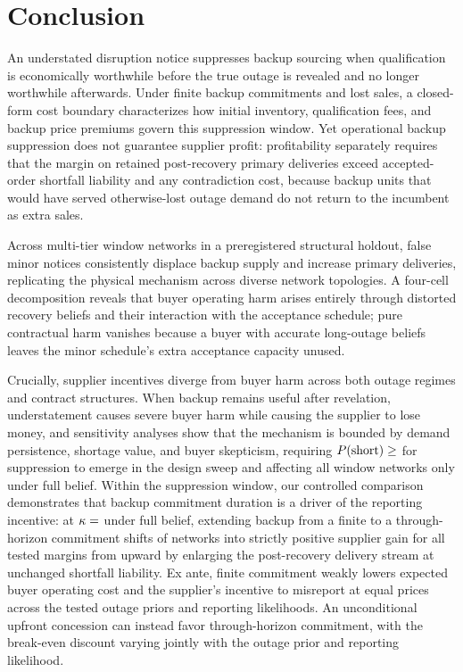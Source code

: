 \documentclass[preprint,11pt,authoryear]{elsarticle}
\newcommand{\claim}[1]{} %
\begin{document}
\section{Conclusion}\label{sec:conclusion}
\claim{C1}An understated disruption notice suppresses backup sourcing when qualification is economically worthwhile before the true outage is revealed and no longer worthwhile afterwards. Under finite backup commitments and lost sales, a closed-form cost boundary characterizes how initial inventory, qualification fees, and backup price premiums govern this suppression window. \claim{C2}Yet operational backup suppression does not guarantee supplier profit: profitability separately requires that the margin on retained post-recovery primary deliveries exceed accepted-order shortfall liability and any contradiction cost, because backup units that would have served otherwise-lost outage demand do not return to the incumbent as extra sales.

\claim{C3}Across  multi-tier window networks in a preregistered structural holdout, false minor notices consistently displace backup supply and increase primary deliveries, replicating the physical mechanism across diverse network topologies. \claim{C4}A four-cell decomposition reveals that buyer operating harm arises entirely through distorted recovery beliefs and their interaction with the acceptance schedule; pure contractual harm vanishes because a buyer with accurate long-outage beliefs leaves the minor schedule's extra acceptance capacity unused.

\claim{C5}Crucially, supplier incentives diverge from buyer harm across both outage regimes and contract structures. When backup remains useful after revelation, understatement causes severe buyer harm while causing the supplier to lose money, and sensitivity analyses show that the mechanism is bounded by demand persistence, shortage value, and buyer skepticism, requiring $P(\mathrm{short})\geq\db{alpha2}$ for suppression to emerge in the design sweep and affecting all  window networks only under full belief. Within the suppression window, our controlled comparison demonstrates that backup commitment duration is a driver of the reporting incentive: at $\kappa=\pc{kappa}$ under full belief, extending backup from a finite to a through-horizon commitment shifts  of  networks into strictly positive supplier gain for all tested margins from  upward by enlarging the post-recovery delivery stream at unchanged shortfall liability. Ex ante, finite commitment weakly lowers expected buyer operating cost and the supplier's incentive to misreport at equal prices across the tested outage priors and reporting likelihoods. An unconditional upfront concession can instead favor through-horizon commitment, with the break-even discount varying jointly with the outage prior and reporting likelihood.
\end{document}
